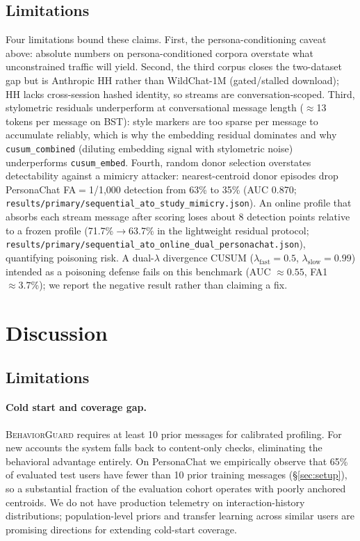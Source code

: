 \documentclass[conference]{IEEEtran}
\newcommand{\BG}{\textsc{BehaviorGuard}}
\begin{document}
\subsection{Limitations}
\label{sec:cusum:limitations}

Four limitations bound these claims.
First, the persona-conditioning caveat above: absolute numbers on
persona-conditioned corpora overstate what unconstrained traffic will yield.
Second, the third corpus closes the two-dataset gap but is Anthropic HH rather than
WildChat-1M (gated/stalled download); HH lacks cross-session hashed identity, so
streams are conversation-scoped.
Third, stylometric residuals underperform at conversational message length
($\approx$13 tokens per message on BST): style markers are too sparse per message
to accumulate reliably, which is why the embedding residual dominates and why
\texttt{cusum\_combined} (diluting embedding signal with stylometric noise)
underperforms \texttt{cusum\_embed}.
Fourth, random donor selection overstates detectability against a mimicry attacker:
nearest-centroid donor episodes drop PersonaChat FA$=$1/1{,}000 detection from
63\% to 35\% (AUC 0.870; \texttt{results/primary/sequential\_ato\_study\_mimicry.json}).
An online profile that absorbs each stream message after scoring loses about
8 detection points relative to a frozen profile (71.7\%$\to$63.7\% in the
lightweight residual protocol;
\texttt{results/primary/sequential\_ato\_online\_dual\_personachat.json}), quantifying
poisoning risk.
A dual-$\lambda$ divergence CUSUM ($\lambda_{\mathrm{fast}}{=}0.5$,
$\lambda_{\mathrm{slow}}{=}0.99$) intended as a poisoning defense fails on this
benchmark (AUC $\approx 0.55$, FA1 $\approx 3.7\%$); we report the negative
result rather than claiming a fix.


\section{Discussion}
\label{sec:discussion}

\subsection{Limitations}
\label{sec:limitations}

\paragraph{Cold start and coverage gap.}
\BG{} requires at least 10 prior messages for calibrated profiling.
For new accounts the system falls back to content-only checks, eliminating the behavioral
advantage entirely.
On PersonaChat we empirically observe that 65\% of evaluated test users have fewer than
10 prior training messages (\S\ref{sec:setup}), so a substantial fraction of the
evaluation cohort operates with poorly anchored centroids.
We do not have production telemetry on interaction-history distributions; population-level
priors and transfer learning across similar users are promising directions for extending
cold-start coverage.
\end{document}

